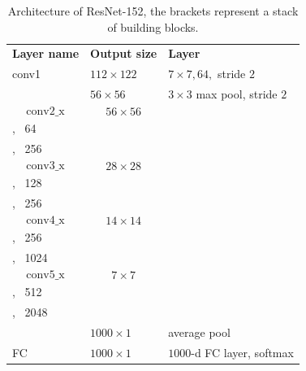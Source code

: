 \begin{table}
    \centering
    \begingroup
    
    \begin{tabular}{>{\centering\arraybackslash}p{}|>{\centering\arraybackslash}p{}|>{\centering\arraybackslash}p{}}


        \hline
        \multicolumn{3}{c}{\textbf{ResNet-152 architecture}}\\
        \hline
        \textbf{Layer name} & \textbf{Output size} & \textbf{Layer} \\
        \hline
        \hline
        conv1 & $112 \times 122$ & $7 \times 7, 64,$ stride $2$ \\
        \hline
          & $56 \times 56$ & $3 \times 3$ max pool, stride $2$ \\
        \hline

        \[ \textrm{conv2\char`_x} \] &  \[56 \times 56 \] & \[\left[ \begin{array}{c} 1 \times 1, \, 64\\ 3 \times 3, \, 64 \\ 1 \times 1, \, 256  \end{array} \right] \times 3 \]\\
        \hline

        \[ \textrm{conv3\char`_x} \] &  \[28 \times 28 \] & \[\left[ \begin{array}{c} 1 \times 1, \, 128 \\ 3 \times 3, \, 128  \\ 1 \times 1, \, 256  \end{array}\right] \times 8 \]\\
        \hline

        \[ \textrm{conv4\char`_x} \] &  \[14 \times 14 \] & \[\left[ \begin{array}{c} 1 \times 1, \, 256\\ 3 \times 3, \, 256\\ 1 \times 1, \, 1024  \end{array}\right] \times 36 \]\\
        \hline

        \[ \textrm{conv5\char`_x} \] &  \[7 \times 7 \] & \[\left[ \begin{array}{c} 1 \times 1, \, 512\\ 3 \times 3, \, 512\\ 1 \times 1, \, 2048  \end{array}\right] \times 3 \]\\
        \hline
        & $1000 \times 1$ & average pool \\
        \hline
        FC & $1000 \times 1$ & $1000$-d FC layer, softmax \\
        \hline
        \end{tabular}
    \endgroup
    \caption{Architecture of ResNet-152, the brackets represent a stack of building blocks.}
    \label{table:resnet-152}
\end{table}

